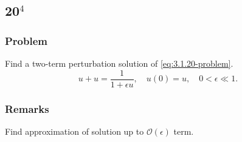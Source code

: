 \documentclass[12pt]{article}
\begin{document}
\newpage
\subsection{20$^4$}
\subsubsection*{Problem}
Find a two-term perturbation solution of \cref{eq:3.1.20-problem}.
\begin{equation}
  \label{eq:3.1.20-problem}
  u+u=\frac{1}{1+\epsilon u},\quad u(0)=u,\quad 0<\epsilon\ll1.
\end{equation}

\subsubsection*{Remarks}
Find approximation of solution up to $\mathcal{O}(\epsilon)$ term.
\end{document}
